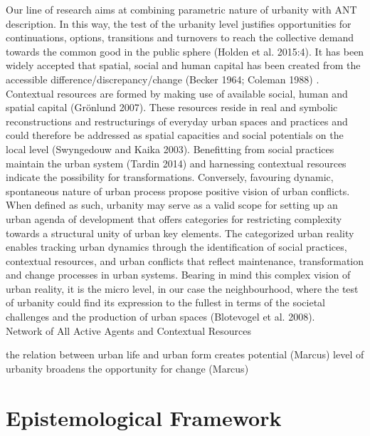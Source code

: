 \documentclass[11pt]{report}
\begin{document}
Our line of research aims at combining parametric nature of urbanity with ANT description. In this way, the test of the urbanity level justifies opportunities for continuations, options, transitions and turnovers to reach the collective demand towards the common good in the public sphere (Holden et al. 2015:4). It has been widely accepted that spatial, social and human capital has been created from the accessible difference/discrepancy/change (Becker 1964; Coleman 1988) . Contextual resources are formed by making use of available social, human and spatial capital (Grönlund 2007). These resources reside in real and symbolic reconstructions and restructurings of everyday urban spaces and practices and could therefore be addressed as spatial capacities and social potentials on the local level (Swyngedouw and Kaika 2003). Benefitting from social practices maintain the urban system (Tardin 2014) and harnessing contextual resources indicate the possibility for transformations. Conversely, favouring dynamic, spontaneous nature of urban process propose positive vision of urban conflicts.
\\ 
When defined as such, urbanity may serve as a valid scope for setting up an urban agenda of development that offers categories for restricting complexity towards a structural unity of urban key elements. The categorized urban reality enables tracking urban dynamics through the identification of social practices, contextual resources, and urban conflicts that reflect maintenance, transformation and change processes in urban systems. Bearing in mind this complex vision of urban reality, it is the micro level, in our case the neighbourhood, where the test of urbanity could find its expression to the fullest in terms of the societal challenges and the production of urban spaces (Blotevogel et al. 2008).
\\
Network of All Active Agents and Contextual Resources

the relation between urban life and urban form creates potential (Marcus)
level of urbanity broadens the opportunity for change (Marcus)

\section{Epistemological Framework}
\end{document}
